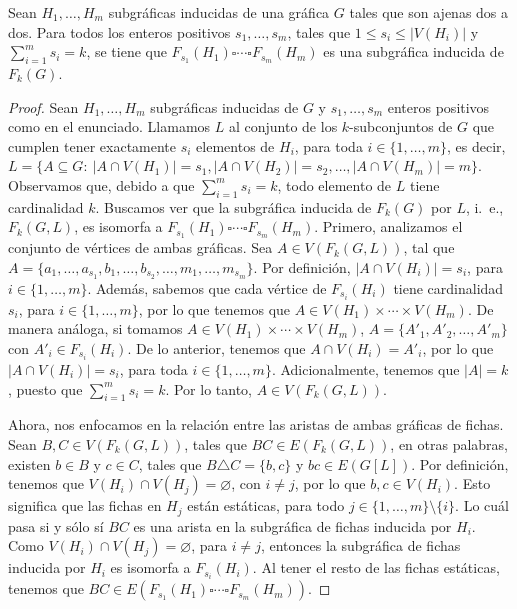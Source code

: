 \begin{teorema}
    \label{teo:PCartes}
    Sean $H_1, \dots, H_m$ subgr\'aficas inducidas de una gr\'afica $G$ tales
    que son ajenas dos a dos. Para todos los enteros positivos $s_1, \dots,
    s_m$, tales que 
    \linebreak
    $1 \leq s_i \leq |V(H_i)|$ y $\sum\limits_{i=1}^{m}  s_i =
    k$, se tiene que $F_{s_1}(H_1) \square \cdots \square F_{s_m}(H_m)$ es una
    subgr\'afica inducida de $F_k(G)$.
\end{teorema}

\begin{proof}
    Sean $H_1, \dots, H_m$ subgr\'aficas inducidas de  $G$ y $s_1, \dots, s_m$
    enteros positivos como en el enunciado. Llamamos $L$ al conjunto de los
    $k$-subconjuntos de $G$ que cumplen tener exactamente $s_i$ elementos de
    $H_i$, para toda $i \in \{1, \dots, m\}$, es decir, $L = \{A \subseteq G
    \colon\ |A\cap V(H_1)|=s_1 , |A \cap V(H_2)|=s_2, \dots, |A \cap V(H_m)|=m
    \}$. Observamos que, debido a  que $\sum\limits_{i=1}^{m} s_i = k$, todo
    elemento de $L$ tiene cardinalidad $k$. Buscamos ver que la subgr\'afica
    inducida de $F_k(G)$ por $L$, i.~e., $F_k(G,L)$, es isomorfa a $F_{s_1}(H_1)
    \square \cdots \square F_{s_m}(H_m)$. Primero, analizamos el conjunto de
    v\'ertices de ambas gr\'aficas. Sea $A \in V(F_k(G,L))$, tal que $A=\{a_1,
    \dots, a_{s_1}, b_1,\dots, b_{s_2}, \dots, m_1, \dots, m_{s_m}\}$. Por
    definici\'on, $|A \cap V(H_i)|= s_i$, para $i \in \{1, \dots, m\}$.
    Adem\'as, sabemos que cada v\'ertice de $F_{s_i}(H_i)$ tiene cardinalidad
    $s_i$, para $i \in \{1, \dots, m\}$, por lo que tenemos que $A \in V(H_1)
    \times \cdots \times V(H_m)$. De manera an\'aloga, si tomamos $A \in V(H_1)
    \times \cdots \times V(H_m)$, $A = \{A'_1, A'_2, \dots, A'_m\}$ con $A'_i
    \in F_{s_i}(H_i)$. De lo anterior, tenemos que $A \cap V(H_i) = A'_i$, por
    lo que $|A \cap V(H_i)|= s_i$, para toda $i \in \{1, \dots, m\}$.
    Adicionalmente, tenemos que $|A|= k$, puesto que $\sum\limits_{i=1}^{m} s_i
    = k$. Por lo tanto, $A \in V(F_k(G,L))$.

    Ahora, nos enfocamos en la relaci\'on entre las aristas de ambas gr\'aficas
    de fichas. Sean $B, C \in V(F_k(G,L))$, tales que $BC \in E(F_k(G,L))$, en
    otras palabras, existen $b \in B$ y $c \in C$, tales que $B \triangle C =
    \{b, c\}$ y $bc \in E(G[L])$. Por definici\'on, tenemos que $V(H_i) \cap
    V(H_j) = \varnothing$, con $i \neq j$, por lo que $b, c \in V(H_i)$. Esto
    significa que las fichas en $H_j$ est\'an est\'aticas, para todo $j \in \{1,
    \dots, m\} \setminus \{i\}$. Lo cu\'al pasa si y s\'olo s\'i $BC$ es una
    arista en la subgr\'afica de fichas inducida por $H_i$. Como $V(H_i) \cap
    V(H_j) = \varnothing$, para $i \neq j$, entonces la subgr\'afica de fichas
    inducida por $H_i$ es isomorfa a $F_{s_i}(H_i)$. Al tener el resto de las
    fichas est\'aticas, tenemos que $BC \in E(F_{s_1}(H_1) \square \cdots
    \square F_{s_m}(H_m))$.


\end{proof}

